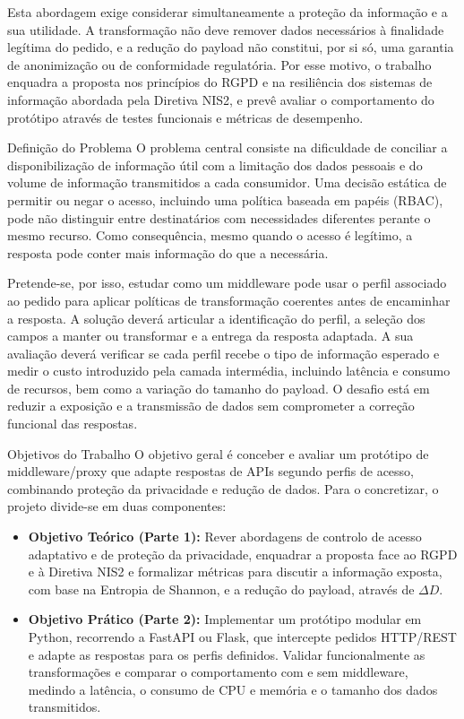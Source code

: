 \documentclass[12pt,reqno, twoside]{amsbook}
\makeatletter
\def\section{\@startsection{section}{1}%
      \z@{.5\linespacing\@plus.7\linespacing}{.25\linespacing}%
      {\normalfont\bfseries\flushleft}}
\theoremstyle{plain}
\numberwithin{equation}{chapter}
\numberwithin{table}{chapter}
\numberwithin{figure}{chapter}
\numberwithin{section}{chapter}
\makeatother
\begin{document}
\noindent Esta abordagem exige considerar simultaneamente a proteção da informação e a sua utilidade. A transformação não deve remover dados necessários à finalidade legítima do pedido, e a redução do payload não constitui, por si só, uma garantia de anonimização ou de conformidade regulatória. Por esse motivo, o trabalho enquadra a proposta nos princípios do RGPD e na resiliência dos sistemas de informação abordada pela Diretiva NIS2, e prevê avaliar o comportamento do protótipo através de testes funcionais e métricas de desempenho.

\section{Definição do Problema}
\noindent O problema central consiste na dificuldade de conciliar a disponibilização de informação útil com a limitação dos dados pessoais e do volume de informação transmitidos a cada consumidor. Uma decisão estática de permitir ou negar o acesso, incluindo uma política baseada em papéis (RBAC), pode não distinguir entre destinatários com necessidades diferentes perante o mesmo recurso. Como consequência, mesmo quando o acesso é legítimo, a resposta pode conter mais informação do que a necessária.

\noindent Pretende-se, por isso, estudar como um middleware pode usar o perfil associado ao pedido para aplicar políticas de transformação coerentes antes de encaminhar a resposta. A solução deverá articular a identificação do perfil, a seleção dos campos a manter ou transformar e a entrega da resposta adaptada. A sua avaliação deverá verificar se cada perfil recebe o tipo de informação esperado e medir o custo introduzido pela camada intermédia, incluindo latência e consumo de recursos, bem como a variação do tamanho do payload. O desafio está em reduzir a exposição e a transmissão de dados sem comprometer a correção funcional das respostas.

\section{Objetivos do Trabalho}
\noindent O objetivo geral é conceber e avaliar um protótipo de middleware/proxy que adapte respostas de APIs segundo perfis de acesso, combinando proteção da privacidade e redução de dados. Para o concretizar, o projeto divide-se em duas componentes:
\begin{itemize}[leftmargin=*]
    \item \textbf{Objetivo Teórico (Parte 1):} Rever abordagens de controlo de acesso adaptativo e de proteção da privacidade, enquadrar a proposta face ao RGPD e à Diretiva NIS2 e formalizar métricas para discutir a informação exposta, com base na Entropia de Shannon, e a redução do payload, através de $\Delta D$.
    \item \textbf{Objetivo Prático (Parte 2):} Implementar um protótipo modular em Python, recorrendo a FastAPI ou Flask, que intercepte pedidos HTTP/REST e adapte as respostas para os perfis definidos. Validar funcionalmente as transformações e comparar o comportamento com e sem middleware, medindo a latência, o consumo de CPU e memória e o tamanho dos dados transmitidos.
\end{itemize}
\end{document}
